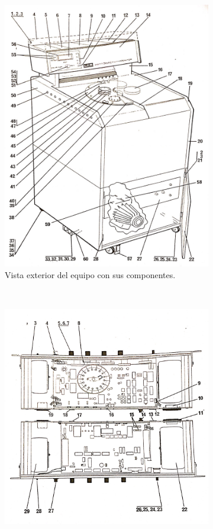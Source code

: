 	\begin{figure}[h]
		\centering
		\begin{subfigure}[b]{0.3\textwidth}
			\includegraphics[width=\textwidth]{Figures/images_1.jpg}
			\caption{Vista exterior del equipo con sus componentes.}
			\label{fig:vistaExterior}
		\end{subfigure}
		~ 
		\begin{subfigure}[b]{0.37\textwidth}
			\includegraphics[width=\textwidth]{Figures/images_2.jpg}

\end{subfigure}
\end{figure}
